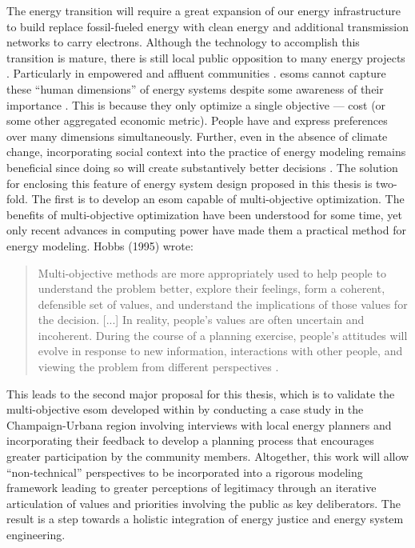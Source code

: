 The energy transition will require a great expansion of our energy
infrastructure to build replace fossil-fueled energy with clean energy and
additional transmission networks to carry electrons. Although the technology to
accomplish this transition is mature, there is still local public opposition to
many energy projects \cite{wolsink_wind_2007}. Particularly in empowered and
affluent communities \cite{stokes_prevalence_2023}. \acp{esom} cannot capture
these ``human dimensions'' of energy systems despite some awareness of their
importance \cite{pfenninger_energy_2014}. This is because they only optimize a
single objective --- cost (or some other aggregated economic metric). People
have and express preferences over many dimensions simultaneously. Further, even
in the absence of climate change, incorporating social context into the practice
of energy modeling remains beneficial since doing so will create substantively
better decisions \cite{wilsdon_see-through_2004}. The solution for enclosing
this feature of energy system design proposed in this thesis is two-fold. The
first is to develop an \ac{esom} capable of multi-objective optimization. The
benefits of multi-objective optimization have been understood for some time, yet
only recent advances in computing power have made them a practical method for
energy modeling. Hobbs (1995) wrote:

\begin{quote}
    Multi-objective methods are more appropriately used to help people to
    understand the problem better, explore their feelings, form a coherent,
    defensible set of values, and understand the implications of those values
    for the decision. [...] In reality, people's values are often uncertain and
    incoherent. During the course of a planning exercise, people's attitudes
    will evolve in response to new information, interactions with other people,
    and viewing the problem from different perspectives
    \cite{hobbs_optimization_1995}.    
\end{quote}

This leads to the second major proposal for this thesis, which is to validate
the multi-objective \ac{esom} developed within by conducting a case study in the
Champaign-Urbana region involving interviews with local energy planners and
incorporating their feedback to develop a planning process that encourages
greater participation by the community members. Altogether, this work will allow
``non-technical'' perspectives to be incorporated into a rigorous modeling
framework leading to greater perceptions of legitimacy through an iterative
articulation of values and priorities involving the public as key deliberators.
The result is a step towards a holistic integration of energy justice and energy
system engineering.

